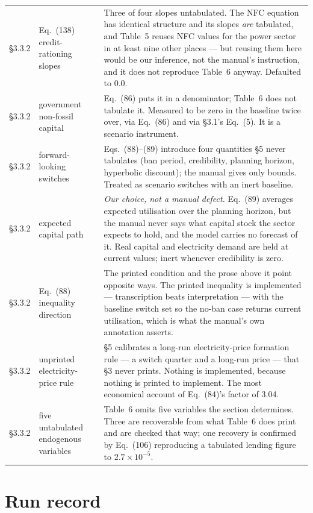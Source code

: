 \begin{table}[h]
\begin{tabularx}{\textwidth}{@{}llX@{}}
\S3.3.2 & Eq.~(138) credit-rationing slopes & Three of four slopes untabulated. The NFC equation has identical structure and its slopes \emph{are} tabulated, and Table~5 reuses NFC values for the power sector in at least nine other places --- but reusing them here would be our inference, not the manual's instruction, and it does not reproduce Table~6 anyway. Defaulted to 0.0. \\
\S3.3.2 & government non-fossil capital & Eq.~(86) puts it in a denominator; Table~6 does not tabulate it. Measured to be zero in the baseline twice over, via Eq.~(86) and via \S3.1's Eq.~(5). It is a scenario instrument. \\
\S3.3.2 & forward-looking switches & Eqs.~(88)--(89) introduce four quantities \S5 never tabulates (ban period, credibility, planning horizon, hyperbolic discount); the manual gives only bounds. Treated as scenario switches with an inert baseline. \\
\S3.3.2 & expected capital path & \emph{Our choice, not a manual defect.} Eq.~(89) averages expected utilisation over the planning horizon, but the manual never says what capital stock the sector expects to hold, and the model carries no forecast of it. Real capital and electricity demand are held at current values; inert whenever credibility is zero. \\
\S3.3.2 & Eq.~(88) inequality direction & The printed condition and the prose above it point opposite ways. The printed inequality is implemented --- transcription beats interpretation --- with the baseline switch set so the no-ban case returns current utilisation, which is what the manual's own annotation asserts. \\
\S3.3.2 & unprinted electricity-price rule & \S5 calibrates a long-run electricity-price formation rule --- a switch quarter and a long-run price --- that \S3 never prints. Nothing is implemented, because nothing is printed to implement. The most economical account of Eq.~(84)'s factor of 3.04. \\
\S3.3.2 & five untabulated endogenous variables & Table~6 omits five variables the section determines. Three are recoverable from what Table~6 does print and are checked that way; one recovery is confirmed by Eq.~(106) reproducing a tabulated lending figure to $2.7\times10^{-5}$. \\
\bottomrule
\end{tabularx}
\end{table}

\section{Run record}
\label{app:runrecord}

